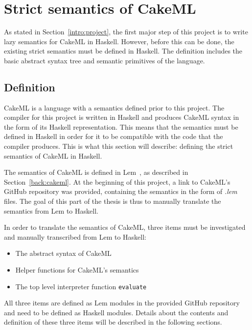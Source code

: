 \chapter{Strict semantics of CakeML}
\label{chapter:strict}
As stated in Section~\ref{intro:project}, the first major step of this project
is to write lazy semantics for CakeML in Haskell. However, before this can be
done, the existing strict semantics must be defined in Haskell. The definition
includes the basic abstract syntax tree and semantic primitives of the
language.

\section{Definition}
CakeML is a language with a semantics defined prior to this project.
The compiler for this project is written in Haskell and produces CakeML
syntax in the form of its Haskell representation. This means that
the semantics must be defined in Haskell in order for it to be compatible with
the code that the compiler produces. This is
what this section will describe: defining the strict semantics of CakeML in
Haskell.

The semantics of CakeML is defined in Lem~\cite{Lem33:online}, as described in
Section~\ref{back:cakeml}. At the beginning of this project, a link to CakeML's
GitHub repository was provided, containing the semantics in the form
of \textit{.lem} files. The goal of this part of the thesis is thus to manually
translate the semantics from Lem to Haskell.

In order to translate the semantics of CakeML, three items must be
investigated and manually transcribed from Lem to Haskell:
\begin{itemize}
\item The abstract syntax of CakeML
\item Helper functions for CakeML's semantics
\item The top level interpreter function \texttt{evaluate}
\end{itemize}

\noindent All three items are defined as Lem modules in the provided GitHub
repository and need to be defined as Haskell modules.
Details about the contents and definition of these three items
will be described in the following sections.

